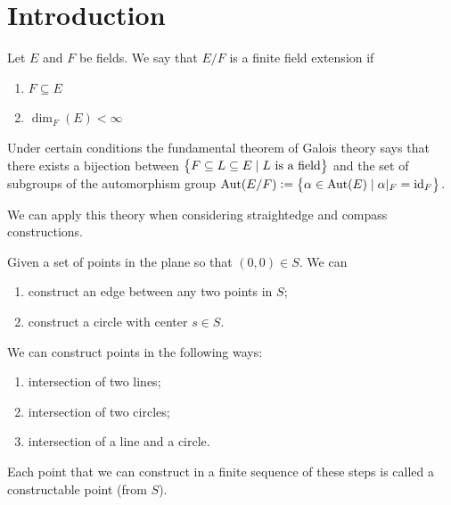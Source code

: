 \documentclass[11pt,a4paper]{article}
\begin{document}
\maketitle


\newpage
\tableofcontents
\newpage

\section{Introduction}

\begin{definition}
  Let $E$ and $F$ be fields.
  We say that $E / F$ is a finite field extension if
  \begin{enumerate}
    \item[(1)] $F \subseteq E$
    \item[(2)] $\dim_F(E) < \infty$
  \end{enumerate}
\end{definition}

\begin{remark}
  Under certain conditions the fundamental theorem of Galois theory
  says that there exists a bijection between
  $\left\{F \subseteq L \subseteq E \mid L \text{ is a field}\right\}$
  and the set of subgroups of the automorphism group
  $\operatorname{Aut}(E/F) := \left\{\alpha \in \operatorname{Aut}(E) \mid \alpha\vert_F = \operatorname{id}_F\right\}$.
\end{remark}

\begin{remark}
  We can apply this theory when considering straightedge and compass
  constructions.
\end{remark}

\begin{example}
  Given a set of points in the plane so that $(0,0) \in S$.
  We can
  \begin{enumerate}
    \item[(1)] construct an edge between any two points in $S$;
    \item[(2)] construct a circle with center $s \in S$.
  \end{enumerate}
  We can construct points in the following ways:
  \begin{enumerate}
    \item[(1)] intersection of two lines;
    \item[(2)] intersection of two circles;
    \item[(3)] intersection of a line and a circle.
  \end{enumerate}
  Each point that we can construct in a finite sequence of these steps
  is called a constructable point (from $S$).
\end{example}
\end{document}
